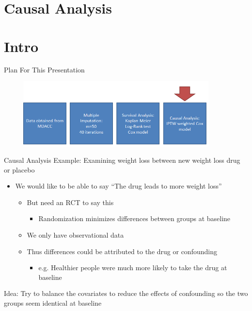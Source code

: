 \section{Causal Analysis}
\section{Intro}
\begin{frame}{Plan For This Presentation}
  \begin{figure}[h!]
  \centering
    \includegraphics[width=0.9\textwidth]{ps_flow}
\label{fig:ps_flow}
\end{figure} 
\end{frame}

\begin{frame}{Causal Analysis}
Example: Examining weight loss between new weight loss drug or placebo
 \begin{itemize}
  \item We would like to be able to say ``The drug leads to more weight loss''
  \begin{itemize}
   \item But need an RCT to say this
   \begin{itemize}
    \item Randomization minimizes differences between groups at baseline
   \end{itemize}

   \item We only have observational data
   \item Thus differences could be attributed to the drug or confounding
   
   \begin{itemize}
    \item e.g. Healthier people were much more likely to take the drug at baseline
   \end{itemize}

  \end{itemize}

 \end{itemize}
 Idea: Try to balance the covariates to reduce the effects of confounding
so the two groups seem identical at baseline
\end{frame}


